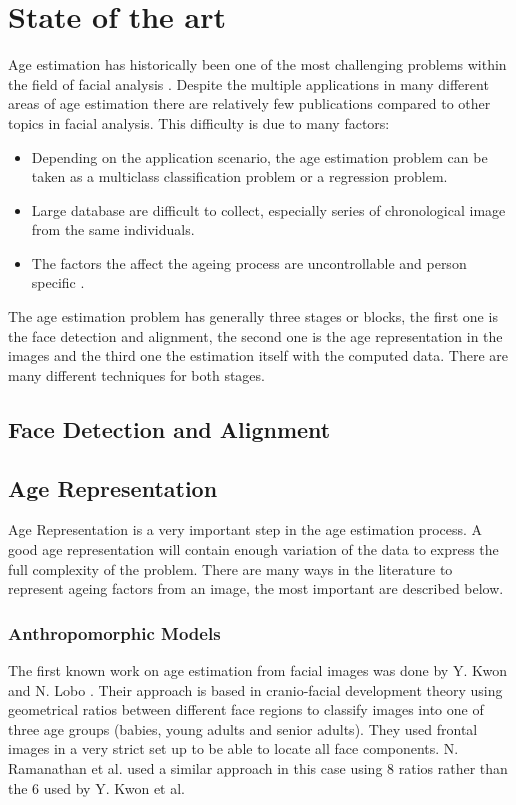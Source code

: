 \chapter{State of the art} \label{chap:sota}

Age estimation has historically been one of the most challenging problems within the field of facial analysis \cite{5406526}\cite{han:age}. Despite the multiple applications in many different areas of age estimation there are relatively few publications compared to other topics in facial analysis. This difficulty is due to many factors: 
\begin{itemize}
	\item Depending on the application scenario, the age estimation problem can be taken as a multiclass classification problem or a regression problem.
	\item Large database are difficult to collect, especially series of chronological image from the same individuals.
	\item The factors the affect the ageing process are uncontrollable and person specific \cite{4284917}\cite{4359348}\cite{1709980}.
\end{itemize}

The age estimation problem has generally three stages or blocks, the first one is the face detection and alignment, the second one is the age representation in the images and the third one the estimation itself with the computed data. There are many different techniques for both stages. \cite{5406526}

\section{Face Detection and Alignment}
\section{Age Representation}

Age Representation is a very important step in the age estimation process. A good age representation will contain enough variation of the data to express the full complexity of the problem. There are many ways in the literature to represent ageing factors from an image, the most important are described below.

\subsection{Anthropomorphic Models}
The first known work on age estimation from facial images was done by Y. Kwon and N. Lobo \cite{Kwon:1999:ACF:311844.311845}. Their approach is based in cranio-facial development theory using geometrical ratios between different face regions to classify images into one of three age groups (babies, young adults and senior adults). They used frontal images in a very strict set up to be able to locate all face components. N. Ramanathan et al. \cite{1640784, Ramanathan2009131} used a similar approach in this case using 8 ratios rather than the 6 used by Y. Kwon et al.

